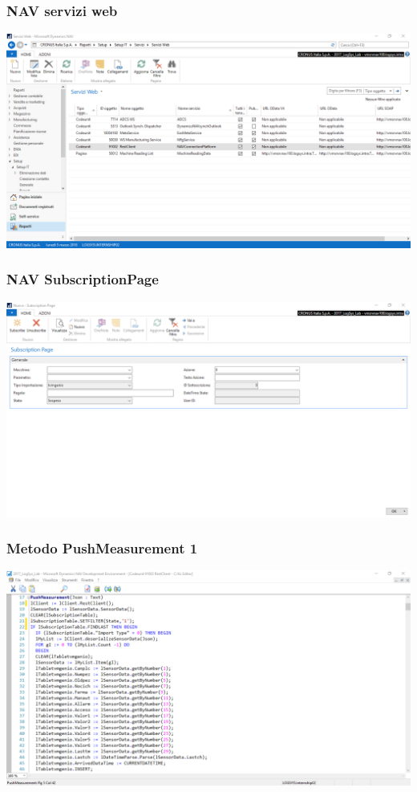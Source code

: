 \documentclass{beamer}
\begin{document}
\begin{frame}
\frametitle{NAV servizi web}
\includegraphics[width=1\textwidth]{images/NAVServiziWeb.png}
\end{frame}


\begin{frame}
\frametitle{NAV SubscriptionPage}
\includegraphics[width=1\textwidth]{images/NAVSubscriptionPage.png}
\end{frame}

\begin{frame}
\frametitle{Metodo PushMeasurement 1}
\includegraphics[width=1\textwidth]{images/NAVPushMeasuraments1.png}
\end{frame}
\end{document}
